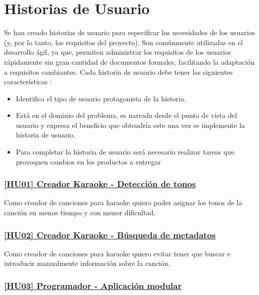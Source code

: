 \section{Historias de Usuario}

Se han creado historias de usuario para especificar las necesidades de los usuarios (y, por lo tanto, los requisitos del proyecto). Son comúnmente utilizadas en el desarrollo ágil, ya que, permiten administrar los requisitos de los usuarios rápidamente sin gran cantidad de documentos formales, facilitando la adaptación a requisitos cambiantes. Cada historia de usuario debe tener las siguientes características \cite{hujj}:

\begin{itemize}
	\item{Identifica el tipo de usuario protagonista de la historia.}
	\item{Está en el dominio del problema, es narrada desde el punto de vista del usuario y expresa el beneficio que obtendría este una vez se implemente la historia de usuario.}
	\item{Para completar la historia de usuario será necesario realizar tareas que provoquen cambios en los productos a entregar}
\end{itemize}


\subsubsection*{\href{https://github.com/dipzza/ultrastar-song2txt/issues/7}{[HU01] Creador Karaoke - Detección de tonos}}\label{sec:hu1}

Como creador de canciones para karaoke quiero poder asignar los tonos de la canción en menos tiempo y con menor dificultad.

\subsubsection*{\href{https://github.com/dipzza/ultrastar-song2txt/issues/8}{[HU02] Creador Karaoke - Búsqueda de metadatos}}

Como creador de canciones para karaoke quiero evitar tener que buscar e introducir manualmente información sobre la canción.


\subsubsection*{\href{https://github.com/dipzza/ultrastar-song2txt/issues/10}{[HU03] Programador - Aplicación modular}}

